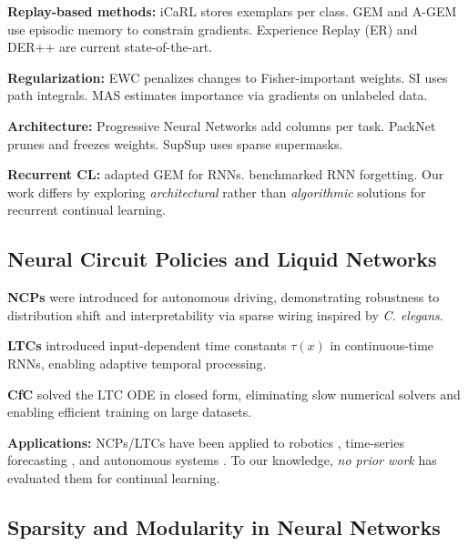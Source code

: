 \documentclass[11pt,twocolumn]{article}
\begin{document}
\textbf{Replay-based methods:} iCaRL \cite{rebuffi2017icarl} stores exemplars per class. GEM \cite{lopez2017gradient} and A-GEM \cite{chaudhry2018efficient} use episodic memory to constrain gradients. Experience Replay (ER) \cite{chaudhry2019tiny} and DER++ \cite{buzzega2020dark} are current state-of-the-art.

\textbf{Regularization:} EWC \cite{kirkpatrick2017overcoming} penalizes changes to Fisher-important weights. SI \cite{zenke2017continual} uses path integrals. MAS \cite{aljundi2018memory} estimates importance via gradients on unlabeled data.

\textbf{Architecture:} Progressive Neural Networks \cite{rusu2016progressive} add columns per task. PackNet \cite{mallya2018packnet} prunes and freezes weights. SupSup \cite{wortsman2020supermasks} uses sparse supermasks.

\textbf{Recurrent CL:} \citet{sodhani2020toward} adapted GEM for RNNs. \citet{cossu2021continual} benchmarked RNN forgetting. Our work differs by exploring \textit{architectural} rather than \textit{algorithmic} solutions for recurrent continual learning.

\subsection{Neural Circuit Policies and Liquid Networks}

\textbf{NCPs} \cite{lechner2020neural} were introduced for autonomous driving, demonstrating robustness to distribution shift and interpretability via sparse wiring inspired by \textit{C. elegans}.

\textbf{LTCs} \cite{hasani2021liquid} introduced input-dependent time constants $\tau(x)$ in continuous-time RNNs, enabling adaptive temporal processing.

\textbf{CfC} \cite{hasani2022closed} solved the LTC ODE in closed form, eliminating slow numerical solvers and enabling efficient training on large datasets.

\textbf{Applications:} NCPs/LTCs have been applied to robotics \cite{lechner2020neural}, time-series forecasting \cite{hasani2021liquid}, and autonomous systems \cite{hasani2022closed}. To our knowledge, \textit{no prior work} has evaluated them for continual learning.

\subsection{Sparsity and Modularity in Neural Networks}
\end{document}
